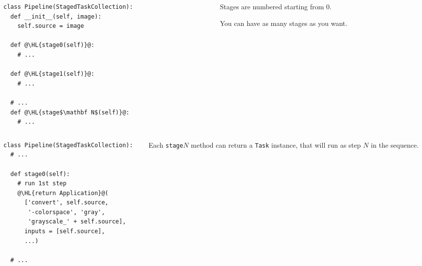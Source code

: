 \documentclass[english,serif,mathserif,xcolor=pdftex,dvipsnames,table]{beamer}
\begin{document}
\begin{frame}[fragile]
  \begin{columns}[c]
    \begin{column}{0.6\textwidth}
      \begin{lstlisting}
class Pipeline(StagedTaskCollection):
  def __init__(self, image):
    self.source = image

  def @\HL{stage0(self)}@:
    # ...

  def @\HL{stage1(self)}@:
    # ...

  # ...
  def @\HL{stage$\mathbf N$(self)}@:
    # ...
      \end{lstlisting}
    \end{column}
    \begin{column}{0.4\textwidth}
      \raggedleft

      Stages are numbered starting from $0$.

      \+
      You can have as many stages as you want.
    \end{column}
  \end{columns}
\end{frame}


\begin{frame}[fragile]
  \begin{columns}[c]
    \begin{column}{0.6\textwidth}
      \begin{lstlisting}
class Pipeline(StagedTaskCollection):
  # ...

  def stage0(self):
    # run 1st step
    @\HL{return Application}@(
      ['convert', self.source,
       '-colorspace', 'gray',
       'grayscale_' + self.source],
      inputs = [self.source],
      ...)

  # ...
      \end{lstlisting}
    \end{column}
    \begin{column}{0.4\textwidth}
      \raggedleft

      Each \texttt{stage$N$} method can return a \texttt{Task}
      instance, that will run as step $N$ in the sequence.
    \end{column}
  \end{columns}
\end{frame}
\end{document}
